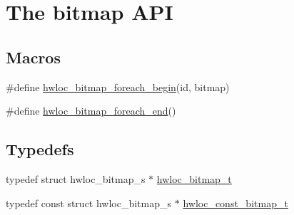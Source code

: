 \hypertarget{a00205}{}\section{The bitmap A\+PI}
\label{a00205}
\subsection*{Macros}
\begin{DoxyCompactItemize}
\item 
\#define \hyperlink{a00205_ga3f6861045a8029ade373510ffa727d2a}{hwloc\+\_\+bitmap\+\_\+foreach\+\_\+begin}(id,  bitmap)
\item 
\#define \hyperlink{a00205_gafcf3246db406218d4e155735b3fa6528}{hwloc\+\_\+bitmap\+\_\+foreach\+\_\+end}()
\end{DoxyCompactItemize}
\subsection*{Typedefs}
\begin{DoxyCompactItemize}
\item 
typedef struct hwloc\+\_\+bitmap\+\_\+s $\ast$ \hyperlink{a00205_gaa3c2bf4c776d603dcebbb61b0c923d84}{hwloc\+\_\+bitmap\+\_\+t}
\item 
typedef const struct hwloc\+\_\+bitmap\+\_\+s $\ast$ \hyperlink{a00205_gae991a108af01d408be2776c5b2c467b2}{hwloc\+\_\+const\+\_\+bitmap\+\_\+t}
\end{DoxyCompactItemize}

